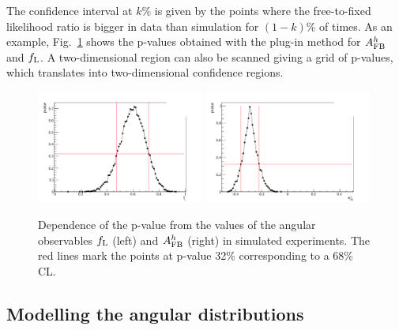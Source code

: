 The confidence interval at $k\%$ is given by the points where the free-to-fixed likelihood ratio is bigger in data than
simulation for $(1-k)\%$ of times. As an example, Fig.~\ref{fig:FCexample} shows the p-values obtained
with the plug-in method for $A_{\rm FB}^h$ and $f_{\rm L}$. A two-dimensional region 
can also be scanned giving a grid of p-values, which translates into two-dimensional confidence regions.
%
\begin{figure}[h!]
\centering
\includegraphics[width=0.49\textwidth]{Lmumu/figs/pvalue_fL_1500_2000_new.pdf}
\includegraphics[width=0.49\textwidth]{Lmumu/figs/pvalue_afbB_1500_2000_new.pdf}
\caption{ Dependence of the p-value from the values of the angular observables $f_{\rm L}$ (left) 
and $A_{\rm FB}^h$ (right) in simulated experiments. The red lines mark the points
at p-value 32\% corresponding to a 68\% CL.}
\label{fig:FCexample}
\end{figure}

\subsection{Modelling the angular distributions}
\label{sec:angfit}

